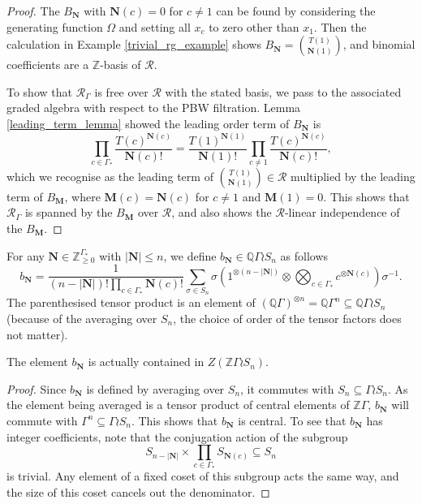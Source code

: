 \documentclass[ALCO,Unicode]{cedram}
\newcommand{\RGamma}{\mathcal{R}_{\Gamma}}
\newcommand{\RGamma}{\mathcal{R}_{\Gamma}}
\begin{document}
\begin{proof}
The $B_{\mathbf{N}}$ with $\mathbf{N}(c) = 0$ for $c \neq 1$ can be found by considering the generating function $\Omega$ and setting all $x_c$ to zero other than $x_1$. Then the calculation in Example \ref{trivial_rg_example} shows $B_{\mathbf{N}} = \binom{T(1)}{\mathbf{N}(1)}$, and binomial coefficients are a $\mathbb{Z}$-basis of $\mathcal{R}$.

To show that $\RGamma$ is free over $\mathcal{R}$ with the stated basis, we pass to the associated graded algebra with respect to the PBW filtration. Lemma \ref{leading_term_lemma} showed the leading order term of $B_{\mathbf{N}}$ is 
\[
\prod_{c \in \Gamma_*} \frac{T(c)^{\mathbf{N}(c)}}{\mathbf{N}(c)!} = 
\frac{T(1)^{\mathbf{N}(1)}}{\mathbf{N}(1)!}  \prod_{c \neq 1} \frac{T(c)^{\mathbf{N}(c)}}{\mathbf{N}(c)!},
\]
which we recognise as the leading term of $\binom{T(1)}{\mathbf{N}(1)} \in \mathcal{R}$ multiplied by the leading term of $B_{\mathbf{M}}$, where $\mathbf{M}(c) = \mathbf{N}(c)$ for $c \neq 1$ and $\mathbf{M}(1) = 0$. This shows that $\RGamma$ is spanned by the $B_{\mathbf{M}}$ over $\mathcal{R}$, and also shows the $\mathcal{R}$-linear independence of the $B_{\mathbf{M}}$.
\end{proof}



\begin{definition}
For any $\mathbf{N} \in \mathbb{Z}_{\geq 0}^{\Gamma_*}$ with $|\mathbf{N}| \leq n$, we define $b_{\mathbf{N}} \in \mathbb{Q}\Gamma \wr S_n$ as follows
\[
b_{\mathbf{N}} = \frac{1}{(n - |\mathbf{N}|)! \prod_{c \in \Gamma_*} \mathbf{N}(c)!}
\sum_{\sigma \in S_n} \sigma \left( 1^{\otimes (n - |\mathbf{N}|)} \otimes \bigotimes_{c \in \Gamma_*} c^{\otimes \mathbf{N}(c)} \right) \sigma^{-1}.
\]
The parenthesised tensor product is an element of $(\mathbb{Q} \Gamma)^{\otimes n} = \mathbb{Q}\Gamma^n \subseteq \mathbb{Q}\Gamma \wr S_n$ \textup{(}because of the averaging over $S_n$, the choice of order of the tensor factors does not matter\textup{)}.
\end{definition}
\begin{lemma}
The element $b_{\mathbf{N}}$ is actually contained in $Z(\mathbb{Z}\Gamma \wr S_n)$.
\end{lemma}
\begin{proof}
Since $b_{\mathbf{N}}$ is defined by averaging over $S_n$, it commutes with $S_n \subseteq \Gamma \wr S_n$. As the element being averaged is a tensor product of central elements of $\mathbb{Z}\Gamma$, $b_{\mathbf{N}}$ will commute with $\Gamma^n \subseteq \Gamma \wr S_n$. This shows that $b_{\mathbf{N}}$ is central. To see that $b_{\mathbf{N}}$ has integer coefficients, note that the conjugation action of the subgroup 
\[
S_{n - |\mathbf{N}|} \times \prod_{c \in \Gamma_*} S_{\mathbf{N}(c)} \subseteq S_n
\]
is trivial. Any element of a fixed coset of this subgroup acts the same way, and the size of this coset cancels out the denominator.
\end{proof}
\end{document}
